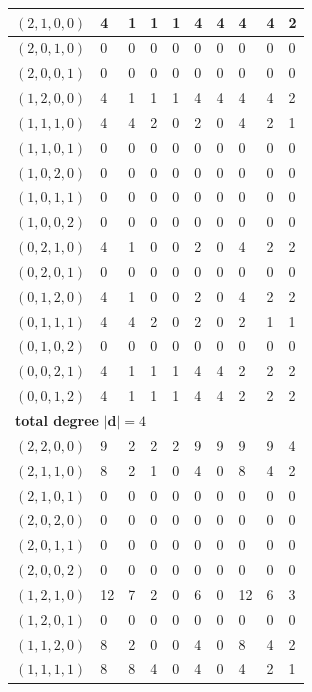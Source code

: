 \documentclass{article}
\newcommand{\bd}{\mathbf{d}}
\begin{document}
\begin{longtable}{|l|l|l|l|l|l|l|l|l|l|}
$(2,1,0,0)$ & 4 & 1 & 1 & 1 & 4 & 4 & 4 & 4 & 2 \\ \hline
$(2,0,1,0)$ & 0 & 0 & 0 & 0 & 0 & 0 & 0 & 0 & 0 \\ \hline
$(2,0,0,1)$ & 0 & 0 & 0 & 0 & 0 & 0 & 0 & 0 & 0 \\ \hline
$(1,2,0,0)$ & 4 & 1 & 1 & 1 & 4 & 4 & 4 & 4 & 2 \\ \hline
$(1,1,1,0)$ & 4 & 4 & 2 & 0 & 2 & 0 & 4 & 2 & 1 \\ \hline
$(1,1,0,1)$ & 0 & 0 & 0 & 0 & 0 & 0 & 0 & 0 & 0 \\ \hline
$(1,0,2,0)$ & 0 & 0 & 0 & 0 & 0 & 0 & 0 & 0 & 0 \\ \hline
$(1,0,1,1)$ & 0 & 0 & 0 & 0 & 0 & 0 & 0 & 0 & 0 \\ \hline
$(1,0,0,2)$ & 0 & 0 & 0 & 0 & 0 & 0 & 0 & 0 & 0 \\ \hline
$(0,2,1,0)$ & 4 & 1 & 0 & 0 & 2 & 0 & 4 & 2 & 2 \\ \hline
$(0,2,0,1)$ & 0 & 0 & 0 & 0 & 0 & 0 & 0 & 0 & 0 \\ \hline
$(0,1,2,0)$ & 4 & 1 & 0 & 0 & 2 & 0 & 4 & 2 & 2 \\ \hline
$(0,1,1,1)$ & 4 & 4 & 2 & 0 & 2 & 0 & 2 & 1 & 1 \\ \hline
$(0,1,0,2)$ & 0 & 0 & 0 & 0 & 0 & 0 & 0 & 0 & 0 \\ \hline
$(0,0,2,1)$ & 4 & 1 & 1 & 1 & 4 & 4 & 2 & 2 & 2 \\ \hline
$(0,0,1,2)$ & 4 & 1 & 1 & 1 & 4 & 4 & 2 & 2 & 2 \\ \hline
\multicolumn{10}{|l|}{\textbf{total degree }$|\bd|=4$} \\ \hline
$(2,2,0,0)$ & 9 & 2 & 2 & 2 & 9 & 9 & 9 & 9 & 4 \\ \hline
$(2,1,1,0)$ & 8 & 2 & 1 & 0 & 4 & 0 & 8 & 4 & 2 \\ \hline
$(2,1,0,1)$ & 0 & 0 & 0 & 0 & 0 & 0 & 0 & 0 & 0 \\ \hline
$(2,0,2,0)$ & 0 & 0 & 0 & 0 & 0 & 0 & 0 & 0 & 0 \\ \hline
$(2,0,1,1)$ & 0 & 0 & 0 & 0 & 0 & 0 & 0 & 0 & 0 \\ \hline
$(2,0,0,2)$ & 0 & 0 & 0 & 0 & 0 & 0 & 0 & 0 & 0 \\ \hline
$(1,2,1,0)$ & 12 & 7 & 2 & 0 & 6 & 0 & 12 & 6 & 3 \\ \hline
$(1,2,0,1)$ & 0 & 0 & 0 & 0 & 0 & 0 & 0 & 0 & 0 \\ \hline
$(1,1,2,0)$ & 8 & 2 & 0 & 0 & 4 & 0 & 8 & 4 & 2 \\ \hline
$(1,1,1,1)$ & 8 & 8 & 4 & 0 & 4 & 0 & 4 & 2 & 1 \\ \hline

\end{longtable}
\end{document}
